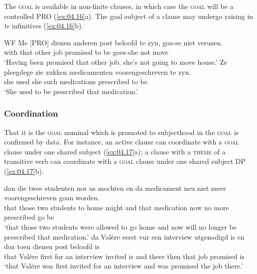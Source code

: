 \documentclass[output=paper]{langsci/langscibook}
\begin{document}
The \textsc{goal}  is available in non-finite 
clauses, in which case the \textsc{goal} will be a controlled PRO
(\ref{ex:04.16}a). The goal subject of a  clause may undergo
raising in \emph{te} infinitives (\ref{ex:04.16}b).

\ea%
    \label{ex:04.16}\glsdesc{WF}
    \ea
	\gll   Me   [PRO]  dienen   anderen   post   beloofd   te   zyn, goa-se     niet   veruzen.\\
    with {}    that   other     job   promised   to   be goes-she   not   move\\
	\glt   ‘Having been promised that other job, she’s not going to move house.’
    \ex
	\gll   Ze   pleegdege   zie   zukken   medicamenten voorengeschreven   te zyn.\\
		    she   used     she  such   medications prescribed     to be\\
	\glt     ‘She used to be prescribed that medication.’
    \z
\z

\subsubsection{Coordination}

That it is the \textsc{goal} nominal which is promoted to subjecthood in the
\textsc{goal}  is confirmed by  data. For instance, an
active clause can coordinate with a \textsc{goal}  clause under
one shared subject (\ref{ex:04.17}a); a clause with a \textsc{theme}
 of a transitive verb can coordinate with a \textsc{goal}
 clause under one shared subject DP (\ref{ex:04.17}b).

\ea%
    \label{ex:04.17}
    \ea
	\gll   dan   die   twee   studenten   nor us     mochten en   da medicament    neu  niet   meer voorengeschreven   goan   worden.\\
		  that  those   two   students   to home   might and   that medication   now  no   more prescribed     go   be\\
	\glt ‘that those two students were allowed to go home and now will no longer be prescribed that medication.’
    \ex
	\gll   da   Valère  eerst  vur   een interview     utgenodigd   is en   doa   toen  dienen   post   beloofd   is\\
		that  Valère  first  for   an interview    invited   is and   there  then  that   job   promised   is\\
	\glt     ‘that Valère was first invited for an interview and was promised the job there.’
    \z
\z
\end{document}
